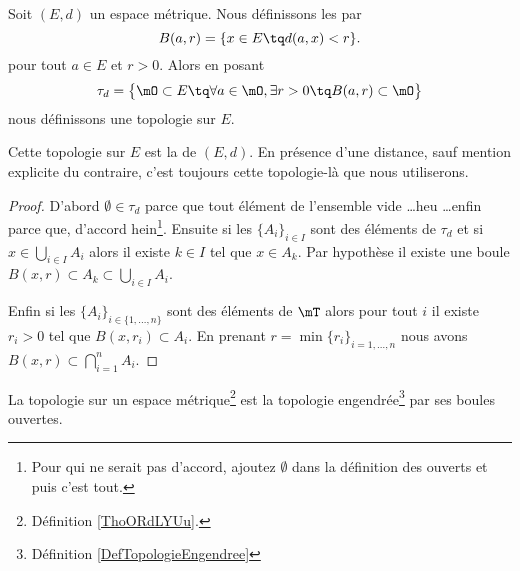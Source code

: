 \begin{theoremDef}     \label{ThoORdLYUu}
	Soit \( (E,d)\) un espace métrique. Nous définissons les  par
	\begin{equation}        \label{EQooYCWSooIhibvd}
		B(a,r)=\{ x\in E\tq d(a,x)<r \}.
	\end{equation}
	pour tout \( a\in E\) et \( r>0\).
	Alors en posant
	\begin{equation}        \label{EqGDVVooDZfwSf}
		\tau_d=\big\{  \mO\subset E  \tq\forall a\in \mO,\exists r>0\tq B(a,r)\subset \mO \big\}
	\end{equation}
	nous définissons une topologie sur \( E\).

	Cette topologie sur \( E\) est la  de \( (E,d)\). En présence d'une distance, sauf mention explicite du contraire, c'est toujours cette topologie-là que nous utiliserons.
\end{theoremDef}

\begin{proof}
	D'abord \( \emptyset\in\tau_d\) parce que tout élément de l'ensemble vide \ldots heu \ldots enfin parce que, d'accord hein\footnote{Pour qui ne serait pas d'accord, ajoutez \( \emptyset\) dans la définition des ouverts et puis c'est tout.}. Ensuite si les \( \{A_i\}_{i\in I}\) sont des éléments de \( \tau_d\) et si \( x\in\bigcup_{i\in I}A_i\) alors il existe \( k\in I\) tel que \( x\in A_k\). Par hypothèse il existe une boule \( B(x,r)\subset A_k\subset\bigcup_{i\in I}A_i\).

	Enfin si les \( \{A_i\}_{i\in\{ 1,\ldots, n \}}\) sont des éléments de \( \mT\) alors pour tout \( i\) il existe \( r_i>0\) tel que \( B(x,r_i)\subset A_i\). En prenant \( r=\min\{ r_i \}_{i=1,\ldots, n}\) nous avons \( B(x,r)\subset\bigcap_{i=1}^nA_i.\)
\end{proof}


\begin{proposition}     \label{PROPooZXTXooEMLgMn}
	La topologie sur un espace métrique\footnote{Définition \ref{ThoORdLYUu}.} est la topologie engendrée\footnote{Définition \ref{DefTopologieEngendree}} par ses boules ouvertes.
\end{proposition}

